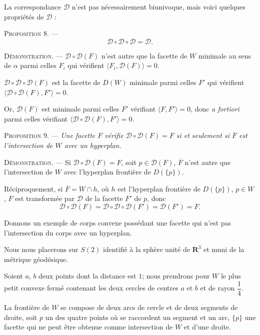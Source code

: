 \documentclass[11pt]{article}
\newcommand{\R}{\boldsymbol{R}}
\newcommand{\Dc}{\mathcal{D}}
\newenvironment{prop}[1][]{\par\medskip\noindent\textsc{Proposition #1.} --- \itshape}{\par\medskip}
\newenvironment{proof}[1][]{\par}{\par}
\begin{document}
La correspondance $\Dc$ n'est pas nécessairement biunivoque, mais voici quelques propriétés de
$\Dc$ :

\begin{prop}[8]
\[ \Dc\circ\Dc\circ\Dc=\Dc. \]
\end{prop}

\begin{proof}
\textsc{Démonstration.} --- $\Dc\circ\Dc(F)$ n'est autre que la facette de $W$ minimale au sens de
$\alpha$ parmi celles $F_i$ qui vérifient $\langle F_i, \Dc(F)\rangle=0$.

$\Dc\circ\Dc\circ\Dc(F)$ est la facette de $D(W)$ minimale parmi celles $F'$ qui vérifient
$\langle\Dc\circ\Dc(F), F'\rangle=0$.

Or, $\Dc(F)$ est minimale parmi celles $F'$ vérifiant $\langle F, F'\rangle=0$, donc \textit{a
fortiori} parmi celles vérifiant $\langle\Dc\circ\Dc(F), F'\rangle=0$.
\end{proof}

\begin{prop}[9]
Une facette $F$ vérifie $\Dc\circ\Dc(F)=F$ si et seulement si $\overline{F}$ est l'intersection de
$W$ avec un hyperplan.
\end{prop}

\begin{proof}
\textsc{Démonstration.} --- Si $\Dc\circ\Dc(F)=F$, soit $p\in\Dc(F)$, $\overline{F}$ n'est autre
que l'intersection de $W$ avec l'hyperplan frontière de $D(\{p\})$.

Réciproquement, si $\overline{F}=W\cap h$, où $h$ est l'hyperplan frontière de $D(\{p\})$,
$p\in W$, $F$ est transformée par $\Dc$ de la facette $F'$ de $p$, donc
\[ \Dc\circ\Dc(F)=\Dc\circ\Dc\circ\Dc(F')=\Dc(F')=F. \]
\end{proof}

Donnons un exemple de corps convexe possédant une facette qui n'est pas l'intersection du corps
avec un hyperplan.

Nous nous placerons sur $S(2)$ identifié à la sphère unité de $\R^3$ et muni de la métrique
géodésique.

Soient $a$, $b$ deux points dont la distance est $1$; nous prendrons pour $W$ le plus petit
convexe fermé contenant les deux cercles de centres $a$ et $b$ et de rayon $\dfrac{1}{4}$.

La frontière de $W$ se compose de deux arcs de cercle et de deux segments de droite, soit $p$ un
des quatre points où se raccordent un segment et un arc, $\{p\}$ une facette qui ne peut être
obtenue comme intersection de $W$ et d'une droite.
\end{document}
